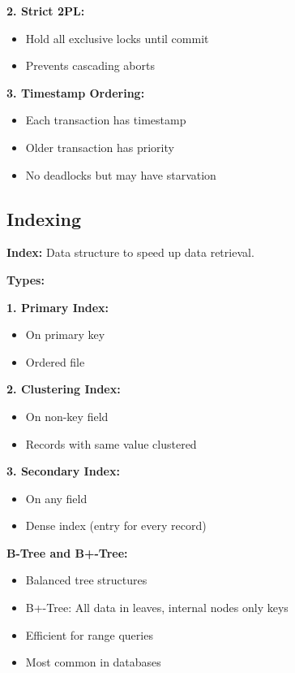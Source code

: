 \documentclass[11pt,a4paper]{article}
\begin{document}
\textbf{2. Strict 2PL:}
\begin{itemize}
    \item Hold all exclusive locks until commit
    \item Prevents cascading aborts
\end{itemize}

\textbf{3. Timestamp Ordering:}
\begin{itemize}
    \item Each transaction has timestamp
    \item Older transaction has priority
    \item No deadlocks but may have starvation
\end{itemize}

\subsection{Indexing}

\begin{defbox}
\textbf{Index:} Data structure to speed up data retrieval.
\end{defbox}

\textbf{Types:}

\textbf{1. Primary Index:}
\begin{itemize}
    \item On primary key
    \item Ordered file
\end{itemize}

\textbf{2. Clustering Index:}
\begin{itemize}
    \item On non-key field
    \item Records with same value clustered
\end{itemize}

\textbf{3. Secondary Index:}
\begin{itemize}
    \item On any field
    \item Dense index (entry for every record)
\end{itemize}

\textbf{B-Tree and B+-Tree:}
\begin{itemize}
    \item Balanced tree structures
    \item B+-Tree: All data in leaves, internal nodes only keys
    \item Efficient for range queries
    \item Most common in databases
\end{itemize}
\end{document}
